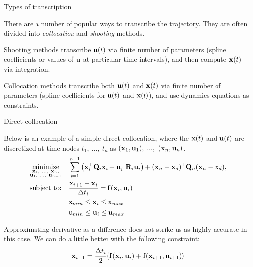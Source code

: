 \documentclass{beamer}
\begin{document}
\begin{frame}{Types of transcription}
	\begin{flushleft}
		
		There are a number of popular ways to transcribe the trajectory. They are often divided into \emph{collocation} and \emph{shooting} methods.
		
		\bigskip
		
		Shooting methods transcribe $\mathbf{u}(t)$ via finite number of parameters (spline coefficients or values of $\mathbf{u}$ at particular time intervals), and then compute $\mathbf{x}(t)$ via integration.
		
		\bigskip
		
		Collocation methods transcribe both $\mathbf{u}(t)$ and $\mathbf{x}(t)$ via finite number of parameters (spline coefficients for $\mathbf{u}(t)$ and $\mathbf{x}(t)$), and use dynamics equations as constraints.		
		
	\end{flushleft}
 \end{frame}




\begin{frame}{Direct collocation}
	\begin{flushleft}
		
		Below is an example of a simple direct collocation, where the $\mathbf{x}(t)$ and $\mathbf{u}(t)$ are discretized at time nodes $t_1, \ ..., \ t_n$ as $(\mathbf{x}_1, \mathbf{u}_1), \ ..., \ (\mathbf{x}_n, \mathbf{u}_n)$.
		\begin{equation*}
			\begin{aligned}
				& \underset{\substack{\mathbf{x}_1, \ ..., \ \mathbf{x}_n, \\ \mathbf{u}_1, \ ..., \ \mathbf{u}_{n-1}}}{\text{minimize}}
				& & \sum\limits_{i=1}^{n-1} \left( \mathbf{x}_i^\top \mathbf{Q}_i \mathbf{x}_i + \mathbf{u}_i^\top \mathbf{R}_i \mathbf{u}_i \right) + (\mathbf{x}_n - \mathbf{x}_d)^\top \mathbf{Q}_n (\mathbf{x}_n - \mathbf{x}_d), \\
				& \text{subject to:}
				& & \frac{\mathbf{x}_{i+1} - \mathbf{x}_i}{\Delta t_i} = 
				\mathbf{f}(\mathbf{x}_i, \mathbf{u}_i) \\
				& & & \mathbf{x}_{min} \leq \mathbf{x}_i \leq \mathbf{x}_{max} \\
				& & & \mathbf{u}_{min} \leq \mathbf{u}_i \leq \mathbf{u}_{max}
			\end{aligned}
		\end{equation*}
		
		Approximating derivative as a difference does not strike us as highly accurate in this case. We can do a little better with the following constraint:
		\begin{equation}
		\mathbf{x}_{i+1} = \frac{\Delta t_i}{2} (\mathbf{f}(\mathbf{x}_i, \mathbf{u}_i) + \mathbf{f}(\mathbf{x}_{i+1}, \mathbf{u}_{i+1}))
		\end{equation} 
		
	\end{flushleft}
\end{frame}
\end{document}
